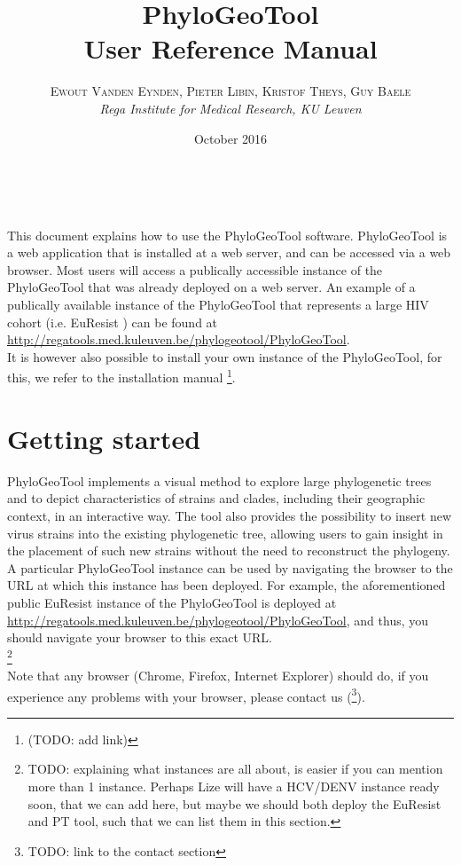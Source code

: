 \documentclass[a4paper, 11pt]{article} %
\title{\textbf{PhyloGeoTool}\\ %
User Reference Manual} %
\author{\textsc{Ewout Vanden Eynden, Pieter Libin, Kristof Theys, Guy Baele} %
\\{\textit{Rega Institute for Medical Research, KU Leuven}}} %
\date{October 2016} %
\makeatletter
\renewcommand{\maketitle}{ %
\begin{flushright} %
{\LARGE\@title} %

\vspace{50pt} %

{\large\@author} %
\\\@date %

\vspace{40pt} %
\end{flushright}
}
\makeatother
\begin{document}
\maketitle %

\vspace{30pt} %

\tableofcontents
\newpage

This document explains how to use the PhyloGeoTool software. PhyloGeoTool is a web application that is installed at a web server, and can be accessed via a web browser. Most users will access a publically accessible instance of the PhyloGeoTool that was already deployed on a web server. An example of a publically available instance of the PhyloGeoTool that represents a large HIV cohort (i.e. EuResist \cite{Zazzi2012}) can be found at \url{http://regatools.med.kuleuven.be/phylogeotool/PhyloGeoTool}.\\
It is however also possible to install your own instance of the PhyloGeoTool, for this, we refer to the installation manual \footnote{(TODO: add link)}.

\section{Getting started}

PhyloGeoTool implements a visual method to explore large phylogenetic trees and to depict characteristics of strains and clades, including their geographic context, in an interactive way.
The tool also provides the possibility to insert new virus strains into the existing phylogenetic tree, allowing users to gain insight in the placement of such new strains without the need to reconstruct the phylogeny. \\

A particular PhyloGeoTool instance can be used by navigating the browser to the URL at which this instance has been deployed. For example, the aforementioned public EuResist instance of the PhyloGeoTool is deployed at \url{http://regatools.med.kuleuven.be/phylogeotool/PhyloGeoTool}, and thus, you should navigate your browser to this exact URL.\\
\footnote{
TODO: explaining what instances are all about, is easier if you can mention more than 1 instance. Perhaps Lize will have a HCV/DENV instance ready soon, that we can add here, but maybe we should both deploy the EuResist and PT tool, such that we can list them in this section.}\\
Note that any browser (Chrome, Firefox, Internet Explorer) should do, if you experience any problems with your browser, please contact us (\footnote{TODO: link to the contact section}).
\end{document}
